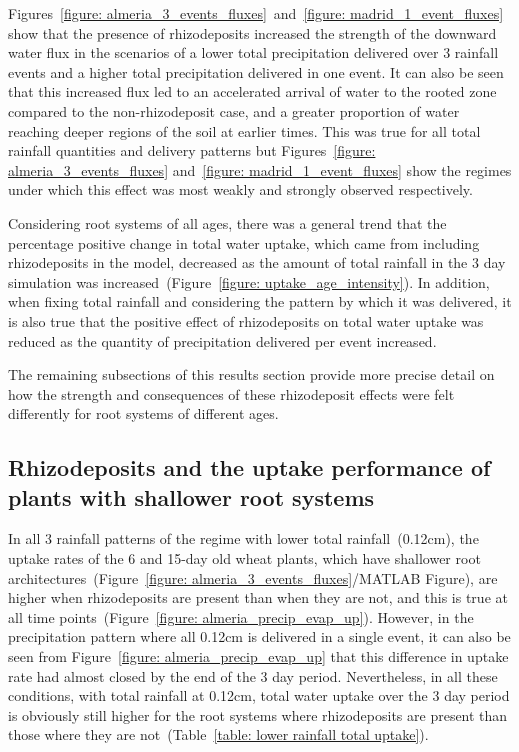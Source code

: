 \documentclass[11pt,a4paper]{article}
\numberwithin{equation}{section}
\begin{document}
Figures~\ref{figure: almeria_3_events_fluxes}~and~\ref{figure: madrid_1_event_fluxes} show that the presence of rhizodeposits increased the strength of the downward water flux in the scenarios of a lower total precipitation delivered over 3 rainfall events and a higher total precipitation delivered in one event. It can also be seen that this increased flux led to an accelerated arrival of water to the rooted zone compared to the non-rhizodeposit case, and a greater proportion of water reaching deeper regions of the soil at earlier times. This was true for all total rainfall quantities and delivery patterns but Figures~\ref{figure: almeria_3_events_fluxes} and~\ref{figure: madrid_1_event_fluxes} show the regimes under which this effect was most weakly and strongly observed respectively.

Considering root systems of all ages, there was a general trend that the percentage positive change in total water uptake, which came from including rhizodeposits in the model, decreased as the amount of total rainfall in the 3 day simulation was increased~(Figure~\ref{figure: uptake_age_intensity}). In addition, when fixing total rainfall and considering the pattern by which it was delivered, it is also true that the positive effect of rhizodeposits on total water uptake was reduced as the quantity of precipitation delivered per event increased.

The remaining subsections of this results section provide more precise detail on how the strength and consequences of these rhizodeposit effects were felt differently for root systems of different ages.

\subsection{Rhizodeposits and the uptake performance of plants with shallower root systems}
In all 3 rainfall patterns of the regime with lower total rainfall~(0.12cm), the uptake rates of the 6 and 15-day old wheat plants, which have shallower root architectures~(Figure~\ref{figure: almeria_3_events_fluxes}/MATLAB Figure), are higher when rhizodeposits are present than when they are not, and this is true at all time points~(Figure~\ref{figure: almeria_precip_evap_up}). However, in the precipitation pattern where all 0.12cm is delivered in a single event, it can also be seen from Figure~\ref{figure: almeria_precip_evap_up} that this difference in uptake rate had almost closed by the end of the 3 day period. Nevertheless, in all these conditions, with total rainfall at 0.12cm, total water uptake over the 3 day period is obviously still higher for the root systems where rhizodeposits are present than those where they are not~(Table~\ref{table: lower rainfall total uptake}).
\end{document}
